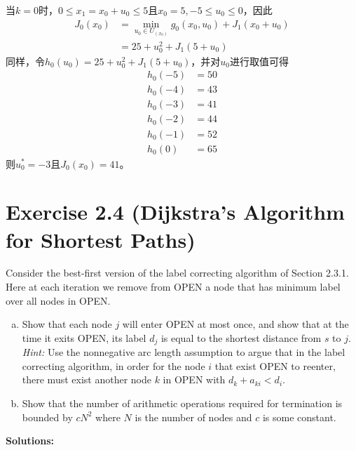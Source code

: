 \documentclass{article}
\begin{document}
\begin{enumerate}[(a)]
            当$k=0$时，$0\leq x_1=x_0+u_0\leq 5$且$x_0=5,-5\leq u_0\leq 0$，因此
            \begin{equation}
                \begin{split}
                    J_0(x_0) &=\min_{u_0\in U_{(x_0)}}g_0(x_0,u_0)+J_1(x_0+u_0)\\
                    &=25+u_0^2+J_1(5+u_0)
                \end{split}
            \end{equation}
            同样，令$h_0(u_0)=25+u_0^2+J_1(5+u_0)$，并对$u_0$进行取值可得
            \begin{equation}
                \begin{aligned}
                    h_0(-5)&=50\\
                    h_0(-4)&=43\\
                    h_0(-3)&=41\\
                    h_0(-2)&=44\\
                    h_0(-1)&=52\\
                    h_0(0)&=65
                \end{aligned}
            \end{equation}
            则$u^*_0=-3$且$J_0(x_0)=41$。
    \end{enumerate}
   

    \section{Exercise 2.4 (Dijkstra's Algorithm for Shortest Paths)}
    Consider the best-first version of the label correcting algorithm of Section 2.3.1. Here at each iteration we remove from OPEN a node that has minimum label over all nodes in OPEN.
    \begin{enumerate}[(a)]
        \item Show that each node $j$ will enter OPEN at most once, and show that at the time it exits OPEN, its label $d_j$ is equal to the shortest distance from $s$ to $j$. \textit{Hint:} Use the nonnegative arc length assumption to argue that in the label correcting algorithm, in order for the node $i$ that exist OPEN to reenter, there must exist another node $k$ in OPEN with $d_k+a_{ki}<d_i$.
        \item Show that the number of arithmetic operations required for termination is bounded by $cN^2$ where $N$ is the number of nodes and $c$ is some constant.
    \end{enumerate}
    \textbf{Solutions:}
\end{document}
